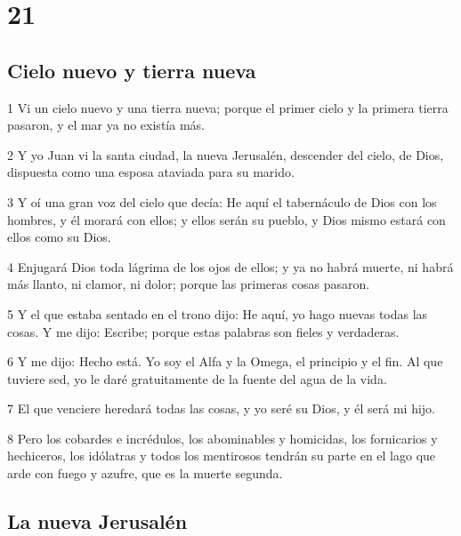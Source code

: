 \chapter{21}

\section*{Cielo nuevo y tierra nueva}

\par 1 Vi un cielo nuevo y una tierra nueva; porque el primer cielo y la primera tierra pasaron, y el mar ya no existía más.
\par 2 Y yo Juan vi la santa ciudad, la nueva Jerusalén, descender del cielo, de Dios, dispuesta como una esposa ataviada para su marido.
\par 3 Y oí una gran voz del cielo que decía: He aquí el tabernáculo de Dios con los hombres, y él morará con ellos; y ellos serán su pueblo, y Dios mismo estará con ellos como su Dios.
\par 4 Enjugará Dios toda lágrima de los ojos de ellos; y ya no habrá muerte, ni habrá más llanto, ni clamor, ni dolor; porque las primeras cosas pasaron.
\par 5 Y el que estaba sentado en el trono dijo: He aquí, yo hago nuevas todas las cosas. Y me dijo: Escribe; porque estas palabras son fieles y verdaderas.
\par 6 Y me dijo: Hecho está. Yo soy el Alfa y la Omega, el principio y el fin. Al que tuviere sed, yo le daré gratuitamente de la fuente del agua de la vida.
\par 7 El que venciere heredará todas las cosas, y yo seré su Dios, y él será mi hijo.
\par 8 Pero los cobardes e incrédulos, los abominables y homicidas, los fornicarios y hechiceros, los idólatras y todos los mentirosos tendrán su parte en el lago que arde con fuego y azufre, que es la muerte segunda.

\section*{La nueva Jerusalén}

